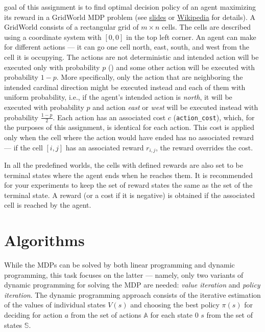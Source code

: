 \documentclass[10pt,journal,compsoc,twoside]{IEEEtran}
\begin{document}
% 
% 
% 
% 
 goal of this assignment is to find optimal decision policy of an agent maximizing its reward in a GridWorld MDP problem (see \href{http://cw.fel.cvut.cz/wiki/_media/courses/b4b36zui/mdps_show.pdf}{slides} or \href{https://en.wikipedia.org/wiki/Markov_decision_process}{Wikipedia} for details). A GridWorld consists of a rectangular grid of $m \times n$ cells. The cells are described using a coordinate system with $[0,0]$ in the top left corner. An agent can make for different actions --- it can go one cell north, east, south, and west from the cell it is occupying. The actions are not deterministic and intended action will be executed only with probability $p$ () and some other action will be executed with probability $1-p$. More specifically, only the action that are neighboring the intended cardinal direction might be executed instead and each of them with uniform probability, i.e., if the agent's intended action is \textit{north}, it will be executed with probability $p$ and action \textit{east} or \textit{west} will be executed instead with probability $\frac{1-p}{2}$. Each action has an associated cost $c$ (\texttt{action\_cost}), which, for the purposes of this assignment, is identical for each action. This cost is applied only when the cell where the action would have ended has no associated reward --- if the cell $[i,j]$ has an associated reward $r_{i,j}$, the reward overrides the cost.

In all the predefined worlds, the cells with defined rewards are also set to be terminal states where the agent ends when he reaches them. It is recommended for your experiments to keep the set of reward states the same as the set of the terminal state. A reward (or a cost if it is negative) is obtained if the associated cell is reached by the agent.

\section{Algorithms}\label{sec:algorithms}
While the MDPs can be solved by both linear programming and dynamic programming, this task focuses on the latter --- namely, only two variants of dynamic programming for solving the MDP are needed: \textit{value iteration} and \textit{policy iteration}. The dynamic programming approach consists of the iterative estimation of the values of individual states $V(s)$ and choosing the best policy $\pi(s)$ for deciding for action $a$ from the set of actions $\mathbb{A}$ for each state 0 $s$ from the set of states $\mathbb{S}$.
\end{document}
